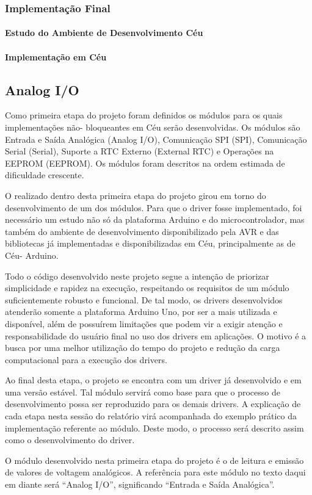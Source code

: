\documentclass{article}
\begin{document}
\subsubsection{Implementação Final}
\paragraph{Estudo do Ambiente de Desenvolvimento Céu}
\paragraph{Implementação em Céu}


\subsection{Analog I/O}

\tab Como primeira etapa do projeto foram definidos os módulos para os quais implementações não-
bloqueantes em Céu serão desenvolvidas. Os módulos são Entrada e Saída Analógica (Analog
I/O), Comunicação SPI (SPI), Comunicação Serial (Serial), Suporte a RTC Externo
(External RTC) e Operações na EEPROM (EEPROM). Os módulos foram descritos na ordem
estimada de dificuldade crescente.
\par O realizado dentro desta primeira etapa do projeto girou em torno do desenvolvimento de um dos
módulos. Para que o driver fosse implementado, foi necessário um estudo não só da plataforma
Arduino e do microcontrolador, mas também do ambiente de desenvolvimento disponibilizado pela
AVR e das bibliotecas já implementadas e disponibilizadas em Céu, principalmente as de Céu-
Arduino.
\par Todo o código desenvolvido neste projeto segue a intenção de priorizar simplicidade e rapidez na
execução, respeitando os requisitos de um módulo suficientemente robusto e funcional. De tal
modo, os drivers desenvolvidos atenderão somente a plataforma Arduino Uno, por ser a mais
utilizada e disponível, além de possuírem limitações que podem vir a exigir atenção e
responsabilidade do usuário final no uso dos drivers em aplicações. O motivo é a busca por uma
melhor utilização do tempo do projeto e redução da carga computacional para a execução dos drivers.
\par Ao final desta etapa, o projeto se encontra com um driver já desenvolvido e em uma versão estável.
Tal módulo servirá como base para que o processo de desenvolvimento possa ser reproduzido para
os demais drivers. A explicação de cada etapa nesta sessão do relatório virá acompanhada do exemplo
prático da implementação referente ao módulo. Deste modo, o processo será descrito assim como o
desenvolvimento do driver.
\par O módulo desenvolvido nesta primeira etapa do projeto é o de leitura e emissão de valores de
voltagem analógicos. A referência para este módulo no texto daqui em diante será “Analog I/O”,
significando “Entrada e Saída Analógica”.
\end{document}
